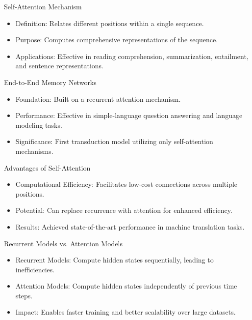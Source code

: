 \documentclass{beamer}
\begin{document}
\begin{frame}{Self-Attention Mechanism}
\begin{itemize}
\item Definition: Relates different positions within a single sequence.
\item Purpose: Computes comprehensive representations of the sequence.
\item Applications: Effective in reading comprehension, summarization, entailment, and sentence representations.
\end{itemize}
\end{frame}

\begin{frame}{End-to-End Memory Networks}
\begin{itemize}
\item Foundation: Built on a recurrent attention mechanism.
\item Performance: Effective in simple-language question answering and language modeling tasks.
\item Significance: First transduction model utilizing only self-attention mechanisms.
\end{itemize}
\end{frame}

\begin{frame}{Advantages of Self-Attention}
\begin{itemize}
\item Computational Efficiency: Facilitates low-cost connections across multiple positions.
\item Potential: Can replace recurrence with attention for enhanced efficiency.
\item Results: Achieved state-of-the-art performance in machine translation tasks.
\end{itemize}
\end{frame}

\begin{frame}{Recurrent Models vs. Attention Models}
\begin{itemize}
\item Recurrent Models: Compute hidden states sequentially, leading to inefficiencies.
\item Attention Models: Compute hidden states independently of previous time steps.
\item Impact: Enables faster training and better scalability over large datasets.
\end{itemize}
\end{frame}
\end{document}
